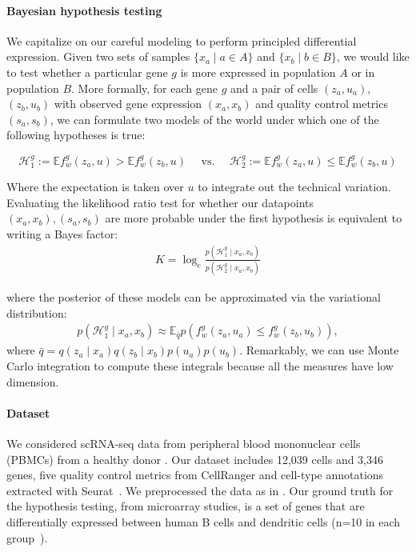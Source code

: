 \paragraph{Bayesian hypothesis testing}
We capitalize on our careful modeling to perform principled differential expression. Given two sets of samples $\{x_a \mid a \in A\}$ and $\{x_b \mid b \in B\}$, we would like to test whether a particular gene $g$ is more expressed in population $A$ or in population $B$. 
More formally, for each gene $g$ and a pair of cells $(z_a, u_a)$, $(z_b, u_b)$ with observed gene expression $(x_a, x_b)$ and quality control metrics $(s_a, s_b)$, we can formulate two models of the world under which one of the following hypotheses is true:

$$\mathcal{H}_1^g:= \mathbb{E}f_w^g(z_a, u) > \mathbb{E}f_w^g(z_b, u) \textrm{~~~~vs.~~~~} \mathcal{H}_2^g:=\mathbb{E}f_w^g(z_a, u) \leq \mathbb{E}f_w^g(z_b, u)$$

Where the expectation is taken over $u$ to integrate out the technical variation. Evaluating the likelihood ratio test for whether our datapoints $(x_a, x_b), (s_a, s_b)$ are more probable under the first hypothesis is equivalent to writing a Bayes factor:
\begin{align}
  K = \log_e \frac{p(\mathcal{H}_1^g \mid x_a, x_b)}{p(\mathcal{H}_2^g \mid x_a, x_b)}
\end{align} 

where the posterior of these models can be approximated via the variational distribution:
\begin{align}
  p(\mathcal{H}_1^g \mid x_a, x_b) \approx \mathbb{E}_{\bar{q}} p(f_w^g(z_a, u_a) \leq f_w^g(z_b, u_b) ),
\end{align} 
where $\bar{q} = q(z_a \mid x_a)q(z_b \mid x_b)p(u_a)p(u_b)$. Remarkably, we can use Monte Carlo integration to compute these integrals because all the measures have low dimension.


\paragraph{Dataset} We considered scRNA-seq data from peripheral
blood mononuclear cells (PBMCs) from a healthy donor \cite{Zheng2017}. Our dataset includes 12,039 cells and 3,346 genes, five quality control metrics from CellRanger and cell-type annotations extracted with Seurat~\cite{SEURAT}. We preprocessed the data as in \cite{Lopez292037,Cole2017}. Our ground truth for the hypothesis testing, from microarray studies, is a set of genes that are differentially expressed between human B cells and dendritic cells (n=10 in each group~\cite{Nakaya2011}).


